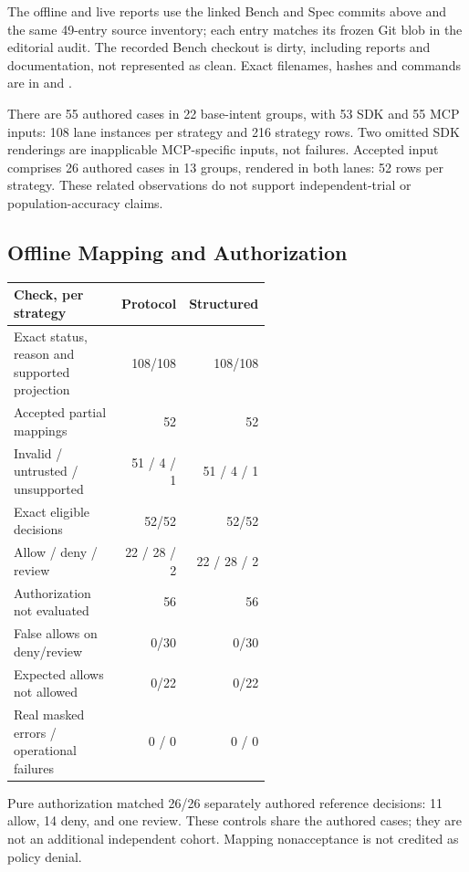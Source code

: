 \documentclass[11pt,letterpaper]{article}
\begin{document}
The offline and live reports use the linked Bench and Spec commits above and
the same 49-entry source inventory; each entry matches its frozen Git blob in
the editorial audit. The recorded Bench checkout is dirty, including reports
and documentation, not represented as clean. Exact filenames, hashes and
commands are in  and .

There are 55 authored cases in 22 base-intent groups, with 53 SDK and 55 MCP
inputs: 108 lane instances per strategy and 216 strategy rows. Two omitted SDK
renderings are inapplicable MCP-specific inputs, not failures. Accepted input
comprises 26 authored cases in 13 groups, rendered in both lanes: 52 rows per
strategy. These related observations do not support independent-trial or
population-accuracy claims.

\subsection{Offline Mapping and Authorization}

\begin{center}
\small
\begin{tabular}{@{}p{0.56\linewidth}rr@{}}
\hline
Check, per strategy & Protocol & Structured \\
\hline
Exact status, reason and supported projection & 108/108 & 108/108 \\
Accepted partial mappings & 52 & 52 \\
Invalid / untrusted / unsupported & 51 / 4 / 1 & 51 / 4 / 1 \\
Exact eligible decisions & 52/52 & 52/52 \\
Allow / deny / review & 22 / 28 / 2 & 22 / 28 / 2 \\
Authorization not evaluated & 56 & 56 \\
False allows on deny/review & 0/30 & 0/30 \\
Expected allows not allowed & 0/22 & 0/22 \\
Real masked errors / operational failures & 0 / 0 & 0 / 0 \\
\hline
\end{tabular}
\end{center}

Pure authorization matched 26/26 separately authored reference decisions:
11 allow, 14 deny, and one review. These controls share the authored cases;
they are not an additional independent cohort. Mapping nonacceptance is not
credited as policy denial.
\end{document}

